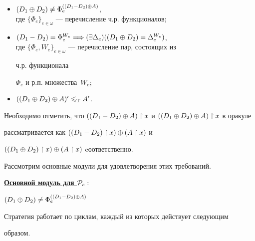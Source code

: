 \begin{itemize}


\item[$\req{P}{e}:$] $(D_1\oplus D_2)\ne\Phi_e^{((D_1-D_2)\oplus A)}$,\\


где $\{\Phi_e\}_{e\in\omega}$ --- перечисление ч.р. функционалов;


\item[$\req{R}{e}:$] $\draz=\Phi_e^{W_e}\Longrightarrow


(\exists\Delta_e)(\dsum=\Delta_e^{W_e})$,\\


где $\{\Phi_e,W_e\}_{e\in\omega}$ --- перечисление пар, состоящих из 


ч.р. функционала


$\Phi_e$ и р.п. множества~$W_e$;


\item[${\cal N}:$] $((D_1\oplus D_2)\oplus A)^\prime\leqslant_{\mathrm T}A^\prime$.


\end{itemize}


Необходимо отметить, что $((D_1-D_2)\oplus A)\restriction x$ и $((D_1\oplus D_2)\oplus A)\restriction x$ в оракуле


рассматривается как $((D_1-D_2)\restriction x)\oplus(A\restriction x)$ и 


$((D_1\oplus D_2)\restriction x)\oplus(A\restriction x)$ cоответственно.


\medskip





Рассмотрим основные модули для удовлетворения этих требований.


\medskip





\underline{\bf Основной модуль для $\req{P}{e}:$}


$(D_1\oplus D_2)\ne\Phi_e^{((D_1-D_2)\oplus A)}$


\medskip





Стратегия работает по циклам, каждый из которых действует следующим


образом.


